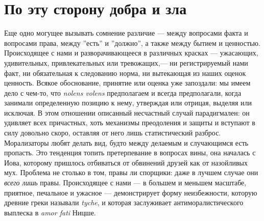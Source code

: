 \documentclass[12pt]{book}
\begin{document}
\section{По эту сторону добра и зла}

Еще одно могущее вызывать сомнение различие --- между вопросами факта и вопросами права, между ''есть'' и ''должно'', а также между бытием и ценностью. Происходящее с нами и разворачивающееся в различных красках --- ужасающих, удивительных, привлекательных или тревожащих,--- ни регистрируемый нами факт, ни обязательная к следованию норма, ни вытекающая из наших оценок ценность. Всякое обоснование, принятие или оценка уже запоздали: мы имеем дело с чем-то, что \textit{nolens volens} предполагаем и всегда предполагали, когда занимали определенную позицию к нему, утверждая или отрицая, выделяя или исключая. В этом отношении описанный несчастный случай парадигмален: он удивляет всех причастных, хоть механизмы преодоления и защиты и вступают в силу довольно скоро, оставляя от него лишь статистический разброс. Морализаторы любят делать вид, будто между делаемым и случающимся есть пропасть. Это тенденция топить претерпевание в вопросах вины, она началась с Иова, которому пришлось отбиваться от обвинений друзей как от назойливых мух. Проблема не столько в том, правы ли спорщики: даже в лучшем случае они \textit{всего лишь} правы. Происходящее с нами --- в большем и меньшем масштабе, приятное, печальное и ужасное --- демонстрирует форму неизбежности, которую древние греки называли \textit{tyche}, и которая заслуживает антиморалистического выплеска в \textit{amor fati} Ницше.
\end{document}
